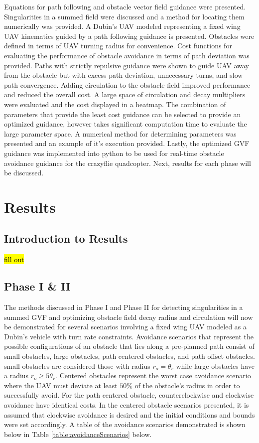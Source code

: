 \documentclass[numbered,pdftex]{ohio-etd}
\begin{document}
Equations for path following and obstacle vector field guidance were presented. Singularities in a summed field were discussed and a method for locating them numerically was provided. A Dubin's UAV modeled representing a fixed wing UAV kinematics guided by a path following guidance is presented. Obstacles were defined in terms of UAV turning radius for convenience. Cost functions for evaluating the performance of obstacle avoidance in terms of path deviation was provided. Paths with strictly repulsive guidance were shown to guide UAV away from the obstacle but with excess path deviation, unnecessary turns, and slow path convergence. Adding circulation to the obstacle field improved performance and reduced the overall cost. A large space of circulation and decay multipliers were evaluated and the cost displayed in a heatmap. The combination of parameters that provide the least cost guidance can be selected to provide an optimized guidance, however takes significant computation time to evaluate the large parameter space. A numerical method for determining parameters was presented and an example of it's execution provided. Lastly, the optimized GVF guidance was implemented into python to be used for real-time obstacle avoidance guidance for the crazyflie quadcopter. Next, results for each phase will be discussed. 


\chapter{Results}
\section{Introduction to Results}
\hl{fill out}

\section{Phase I \& II}

The methods discussed in Phase I and Phase II for detecting singularities in a summed GVF and optimizing obstacle field decay radius and circulation will now be demonstrated for several scenarios involving a fixed wing UAV modeled as a Dubin's vehicle with turn rate constraints. Avoidance scenarios that represent the possible configurations of an obstacle that lies along a pre-planned path consist of small obstacles, large obstacles, path centered obstacles, and path offset obstacles. small obstacles are considered those with radius $r_o = \theta_r$ while large obstacles have a radius $r_o\ge5\theta_r$. Centered obstacles represent the worst case avoidance scenario where the UAV must deviate at least $50\%$ of the obstacle's radius in order to successfully avoid. For the path centered obstacle, counterclockwise and clockwise avoidance have identical costs. In the centered obstacle scenarios presented, it is assumed that clockwise avoidance is desired and the initial conditions and bounds were set accordingly. A table of the avoidance scenarios demonstrated is shown below in Table \ref{table:avoidanceScenarios} below.
\end{document}

